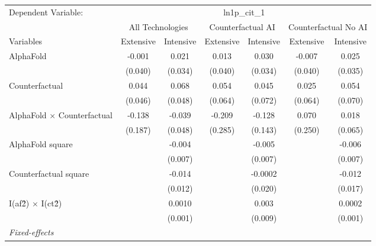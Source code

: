 \begingroup
\centering
\begin{tabular}{lcccccc}
   \tabularnewline \midrule \midrule
   Dependent Variable: & \multicolumn{6}{c}{ln1p\_cit\_1}\\
 & \multicolumn{2}{c}{All Technologies} & \multicolumn{2}{c}{Counterfactual AI} & \multicolumn{2}{c}{Counterfactual No AI} \\
\cmidrule(lr){1-1}\cmidrule(lr){2-3} \cmidrule(lr){4-5} \cmidrule(lr){6-7}
Variables & \multicolumn{1}{c}{Extensive} & \multicolumn{1}{c}{Intensive} & \multicolumn{1}{c}{Extensive} & \multicolumn{1}{c}{Intensive} & \multicolumn{1}{c}{Extensive} & \multicolumn{1}{c}{Intensive} \\
\cmidrule(lr){1-1}\cmidrule(lr){2-2} \cmidrule(lr){3-3} \cmidrule(lr){4-4} \cmidrule(lr){5-5} \cmidrule(lr){6-6} \cmidrule(lr){7-7}
   AlphaFold                          & -0.001  & 0.021   & 0.013   & 0.030   & -0.007  & 0.025\\   
                                      & (0.040) & (0.034) & (0.040) & (0.034) & (0.040) & (0.035)\\   
   Counterfactual                     & 0.044   & 0.068   & 0.054   & 0.045   & 0.025   & 0.054\\   
                                      & (0.046) & (0.048) & (0.064) & (0.072) & (0.064) & (0.070)\\   
   AlphaFold $\times$ Counterfactual  & -0.138  & -0.039  & -0.209  & -0.128  & 0.070   & 0.018\\   
                                      & (0.187) & (0.048) & (0.285) & (0.143) & (0.250) & (0.065)\\   
   AlphaFold square                   &         & -0.004  &         & -0.005  &         & -0.006\\   
                                      &         & (0.007) &         & (0.007) &         & (0.007)\\   
   Counterfactual square              &         & -0.014  &         & -0.0002 &         & -0.012\\   
                                      &         & (0.012) &         & (0.020) &         & (0.017)\\   
   I(af\^2) $\times$ I(ct\^2)         &         & 0.0010  &         & 0.003   &         & 0.0002\\   
                                      &         & (0.001) &         & (0.009) &         & (0.001)\\   
   \midrule
   \emph{Fixed-effects}\\

\end{tabular}
